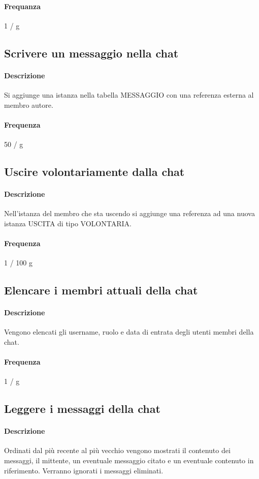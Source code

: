 \documentclass[a4paper,12pt]{report}
\begin{document}
\paragraph{Frequanza} 1 / g

\subsection{Scrivere un messaggio nella chat}
\paragraph{Descrizione} Si aggiunge una istanza nella tabella MESSAGGIO con una referenza esterna al membro autore.
\paragraph{Frequenza} 50 / g 

\subsection{Uscire volontariamente dalla chat}
\paragraph{Descrizione} Nell'istanza del membro che sta uscendo si aggiunge una referenza ad una nuova istanza USCITA di tipo VOLONTARIA.
\paragraph{Frequenza} 1 / 100 g 

\subsection{Elencare i membri attuali della chat}
\paragraph{Descrizione} Vengono elencati gli username, ruolo e data di entrata degli utenti membri della chat.
\paragraph{Frequenza} 1 / g

\subsection{Leggere i messaggi della chat}
\paragraph{Descrizione} Ordinati dal più recente al più vecchio vengono mostrati il contenuto dei messaggi, il mittente, un eventuale messaggio citato e un eventuale contenuto in riferimento. Verranno ignorati i messaggi eliminati.
\end{document}
